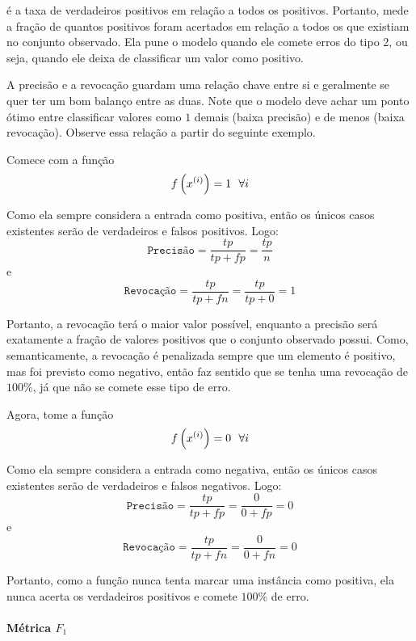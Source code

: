 é a taxa de verdadeiros positivos em relação a todos os positivos. Portanto,
mede a fração de quantos positivos foram acertados em relação a todos os que
existiam no conjunto observado. Ela pune o modelo quando ele comete erros do
tipo 2, ou seja, quando ele deixa de classificar um valor como positivo.

A precisão e a revocação guardam uma relação chave entre si e geralmente se quer
ter um bom balanço entre as duas. Note que o modelo deve achar um ponto ótimo
entre classificar valores como $1$ demais (baixa precisão) e de menos (baixa
revocação). Observe essa relação a partir do seguinte exemplo.

Comece com a função
\begin{equation}
  f\paren{\xii[x]{i}} = 1~~\forall i
\end{equation}


Como ela sempre considera a entrada como positiva, então os únicos casos
existentes serão de verdadeiros e falsos positivos. Logo:
\[
\texttt{Precisão} = \dfrac{tp}{tp+fp} = \dfrac{tp}{n}
\]
e
\[
\texttt{Revocação} = \dfrac{tp}{tp+fn} = \dfrac{tp}{tp+0} = 1
\]

Portanto, a revocação terá o maior valor possível, enquanto a precisão será
exatamente a fração de valores positivos que o conjunto observado possui. Como,
semanticamente, a revocação é penalizada sempre que um elemento é positivo, mas
foi previsto como negativo, então faz sentido que se tenha uma revocação de
$100\%$, já que não se comete esse tipo de erro.

Agora, tome a função
\begin{equation}
  f\paren{\xii[x]{i}} = 0~~\forall i
\end{equation}

Como ela sempre considera a entrada como negativa, então os únicos casos
existentes serão de verdadeiros e falsos negativos. Logo:
\[
\texttt{Precisão} = \dfrac{tp}{tp+fp} = \dfrac{0}{0+fp} = 0
\]
e
\[
\texttt{Revocação} = \dfrac{tp}{tp+fn} = \dfrac{0}{0+fn} = 0
\]

Portanto, como a função nunca tenta marcar uma instância como positiva, ela
nunca acerta os verdadeiros positivos e comete $100\%$ de erro.

\paragraph{Métrica $F_1$}%
\label{par:metrica_f_1_}


